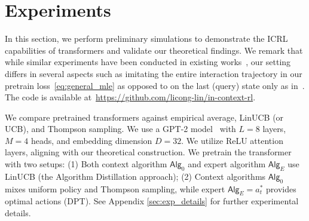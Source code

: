 \documentclass[10pt]{article}
\newcommand{\<}{\left\langle}
\renewcommand{\>}{\right\rangle}
\newcommand{\action}{{a}}
\newcommand{\sAlg}{{\mathsf{Alg}}}
\newcommand{\shortexp}{{E}}
\newcommand{\authnote}[2]{{\scriptsize $\ll$\textsf{#1 notes: #2}$\gg$}}
\newcommand{\authnote}[2]{}
\newcommand{\lc}[1]{{\color{blue}\authnote{Licong}{#1}}}
\begin{document}
\section{Experiments}
\label{sec:experiments}




In this section, we perform preliminary simulations to demonstrate the ICRL capabilities of transformers and validate our theoretical findings. We remark that while similar experiments have been conducted in existing works~\citep{laskin2022context,lee2023supervised}, our setting differs in several aspects such as imitating the entire interaction trajectory in our pretrain loss~\eqref{eq:general_mle} as opposed to on the last (query) state only as in~\citet{lee2023supervised}. The code is available at~\href{https://github.com/licong-lin/in-context-rl}{https://github.com/licong-lin/in-context-rl}.




We compare pretrained transformers against empirical average, LinUCB (or UCB), and Thompson sampling. We use a GPT-2 model~\cite{garg2022can,lee2023supervised} with $L = 8$ layers, $M=4$ heads, and embedding dimension $D=32$. We utilize ReLU attention layers, aligning with our theoretical construction. We pretrain the transformer with two setups: (1) Both context algorithm $\sAlg_0$ and expert algorithm $\sAlg_{\shortexp}$ use LinUCB (the Algorithm Distillation approach); (2) Context algorithms $\sAlg_0$ mixes uniform policy and Thompson sampling, while expert $\sAlg_{\shortexp} = \action_t^*$ provides optimal actions (DPT). See Appendix \ref{sec:exp_details} for further experimental details. 

\end{document}
